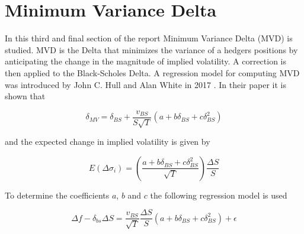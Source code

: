 \documentclass{article}
\begin{document}
\begin{figure}[h]
    \centering
    \hfill
    \label{fig:gamma}
\end{figure}
 
\newpage

\section{Minimum Variance Delta}

In this third and final section of the report Minimum Variance Delta (MVD) is studied. MVD is the Delta that minimizes the variance of a hedgers positions
by anticipating the change in the magnitude of implied volatility. A correction is then applied to the Black-Scholes Delta. 
A regression model for computing MVD was introduced by John C. Hull and Alan White in 2017 \cite{hull}. In their paper it is shown that 

\[
\delta_{MV} = \delta_{BS} + \frac{v_{BS}}{S \sqrt{T}} (a + b \delta_{BS} + c \delta_{BS}^2)
\]

and the expected change in implied volatility is given by

\[
E(\Delta \sigma_i) = \left ( \frac{a + b \delta_{BS} + c \delta_{BS}^2}{\sqrt{T}} \right ) \frac{\Delta S}{S}
\]

To determine the coefficients $a$, $b$ and $c$ the following regression model is used

\[
\Delta f - \delta_{bs} \Delta S = \frac{v_{BS}}{\sqrt{T}} \frac{\Delta S}{S} (a + b \delta_{BS} + c \delta_{BS}^2) + \epsilon
\]
\end{document}
